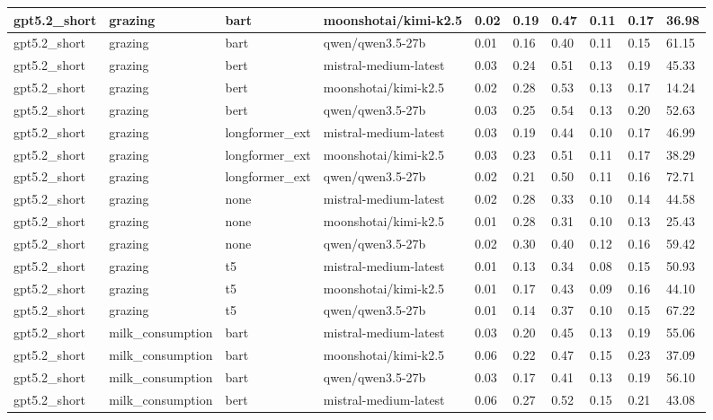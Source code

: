 \begin{tabular}{|l|l|l|l|l|l|l|l|l|l|}
 \hline
 gpt5.2\_short & grazing & bart & moonshotai/kimi-k2.5 & 0.02 & 0.19 & 0.47 & 0.11 & 0.17 & 36.98 \\
 \hline
 gpt5.2\_short & grazing & bart & qwen/qwen3.5-27b & 0.01 & 0.16 & 0.40 & 0.11 & 0.15 & 61.15 \\
 \hline
 gpt5.2\_short & grazing & bert & mistral-medium-latest & 0.03 & 0.24 & 0.51 & 0.13 & 0.19 & 45.33 \\
 \hline
 gpt5.2\_short & grazing & bert & moonshotai/kimi-k2.5 & 0.02 & 0.28 & 0.53 & 0.13 & 0.17 & 14.24 \\
 \hline
 gpt5.2\_short & grazing & bert & qwen/qwen3.5-27b & 0.03 & 0.25 & 0.54 & 0.13 & 0.20 & 52.63 \\
 \hline
 gpt5.2\_short & grazing & longformer\_ext & mistral-medium-latest & 0.03 & 0.19 & 0.44 & 0.10 & 0.17 & 46.99 \\
 \hline
 gpt5.2\_short & grazing & longformer\_ext & moonshotai/kimi-k2.5 & 0.03 & 0.23 & 0.51 & 0.11 & 0.17 & 38.29 \\
 \hline
 gpt5.2\_short & grazing & longformer\_ext & qwen/qwen3.5-27b & 0.02 & 0.21 & 0.50 & 0.11 & 0.16 & 72.71 \\
 \hline
 gpt5.2\_short & grazing & none & mistral-medium-latest & 0.02 & 0.28 & 0.33 & 0.10 & 0.14 & 44.58 \\
 \hline
 gpt5.2\_short & grazing & none & moonshotai/kimi-k2.5 & 0.01 & 0.28 & 0.31 & 0.10 & 0.13 & 25.43 \\
 \hline
 gpt5.2\_short & grazing & none & qwen/qwen3.5-27b & 0.02 & 0.30 & 0.40 & 0.12 & 0.16 & 59.42 \\
 \hline
 gpt5.2\_short & grazing & t5 & mistral-medium-latest & 0.01 & 0.13 & 0.34 & 0.08 & 0.15 & 50.93 \\
 \hline
 gpt5.2\_short & grazing & t5 & moonshotai/kimi-k2.5 & 0.01 & 0.17 & 0.43 & 0.09 & 0.16 & 44.10 \\
 \hline
 gpt5.2\_short & grazing & t5 & qwen/qwen3.5-27b & 0.01 & 0.14 & 0.37 & 0.10 & 0.15 & 67.22 \\
 \hline
 gpt5.2\_short & milk\_consumption & bart & mistral-medium-latest & 0.03 & 0.20 & 0.45 & 0.13 & 0.19 & 55.06 \\
 \hline
 gpt5.2\_short & milk\_consumption & bart & moonshotai/kimi-k2.5 & 0.06 & 0.22 & 0.47 & 0.15 & 0.23 & 37.09 \\
 \hline
 gpt5.2\_short & milk\_consumption & bart & qwen/qwen3.5-27b & 0.03 & 0.17 & 0.41 & 0.13 & 0.19 & 56.10 \\
 \hline
 gpt5.2\_short & milk\_consumption & bert & mistral-medium-latest & 0.06 & 0.27 & 0.52 & 0.15 & 0.21 & 43.08 \\

\end{tabular}
